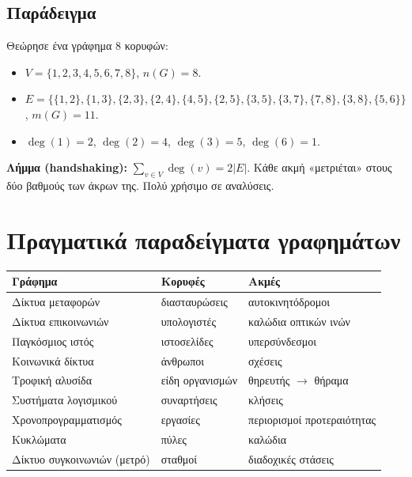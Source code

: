 \documentclass[11pt,a4paper]{article}
\begin{document}
\subsection{Παράδειγμα}

Θεώρησε ένα γράφημα 8 κορυφών:
\begin{itemize}
  \item $V = \{1, 2, 3, 4, 5, 6, 7, 8\}$, $n(G) = 8$.
  \item $E = \{\{1,2\}, \{1,3\}, \{2,3\}, \{2,4\}, \{4,5\}, \{2,5\}, \{3,5\},
  \{3,7\}, \{7,8\}, \{3,8\}, \{5,6\}\}$, $m(G) = 11$.
  \item $\deg(1) = 2$, $\deg(2) = 4$, $\deg(3) = 5$, $\deg(6) = 1$.
\end{itemize}

\begin{keypoint}
\textbf{Λήμμα (handshaking):} $\sum_{v \in V} \deg(v) = 2 |E|$. Κάθε ακμή
«μετριέται» στους δύο βαθμούς των άκρων της. Πολύ χρήσιμο σε αναλύσεις.
\end{keypoint}

\section{Πραγματικά παραδείγματα γραφημάτων}

\begin{center}
\begin{tabular}{@{}l l l@{}}
\toprule
Γράφημα & Κορυφές & Ακμές \\
\midrule
Δίκτυα μεταφορών            & διασταυρώσεις    & αυτοκινητόδρομοι \\
Δίκτυα επικοινωνιών         & υπολογιστές      & καλώδια οπτικών ινών \\
Παγκόσμιος ιστός            & ιστοσελίδες      & υπερσύνδεσμοι \\
Κοινωνικά δίκτυα            & άνθρωποι         & σχέσεις \\
Τροφική αλυσίδα             & είδη οργανισμών  & θηρευτής $\to$ θήραμα \\
Συστήματα λογισμικού        & συναρτήσεις      & κλήσεις \\
Χρονοπρογραμματισμός        & εργασίες         & περιορισμοί προτεραιότητας \\
Κυκλώματα                   & πύλες            & καλώδια \\
Δίκτυο συγκοινωνιών (μετρό) & σταθμοί          & διαδοχικές στάσεις \\
\bottomrule
\end{tabular}
\end{center}
\end{document}
